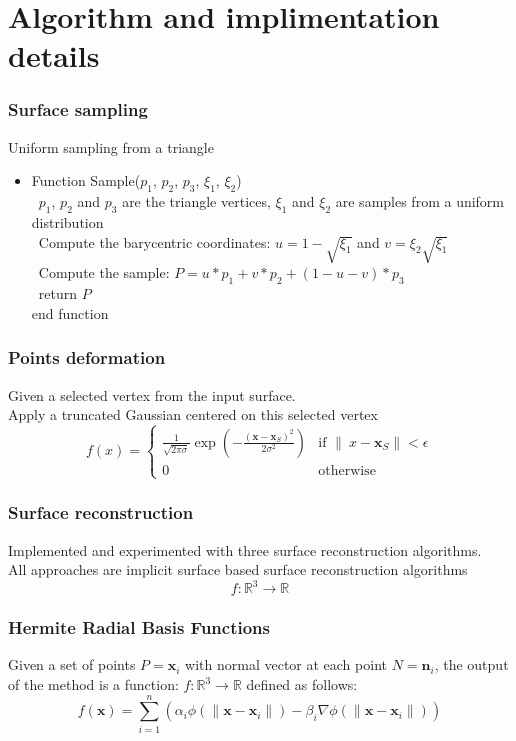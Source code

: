 \documentclass{beamer}
\def\x{\mathbf{x}}
\def\R{\mathbb{R}}
\def\n{\mathbf{n}}
\begin{document}
\section{Algorithm and implimentation details}
\Large

\begin{frame}
\frametitle{Surface sampling}
Uniform sampling from a triangle\\
\begin{itemize}
\item Function Sample($p_1$, $p_2$, $p_3$, $\xi_1$, $\xi_2$)\\

\  $p_1$, $p_2$ and $p_3$ are the triangle vertices, $\xi_1$ and $\xi_2$ are samples from a uniform distribution\\

\  Compute the barycentric coordinates: $u = 1-\sqrt{\xi_1}$ and $v = \xi_2 \sqrt{\xi_1}$\\

\  Compute the sample: $P = u * p_1 + v * p_2 + (1 - u - v) * p_3$\\
\   return $P$\\
end function
\end{itemize}
\end{frame}


\begin{frame}
	\frametitle{Points deformation}

		Given a selected vertex from the input surface. \\
		Apply a truncated Gaussian centered on this selected vertex \\
\[f(x)=
\begin{cases}

 \frac{1}{\sqrt{2\pi \sigma}} \exp \left(- \frac{(\x- \x_S)^{2}}{2 \sigma^{2}}\right) & \text{if } \|\ x-\x_S\| < \epsilon \\
0 & \text{otherwise}
\end{cases}
\]
\end{frame}

\begin{frame}
	\frametitle{Surface reconstruction}
	\Large
	Implemented and experimented with three surface reconstruction algorithms.\\
	All approaches are implicit surface based surface reconstruction algorithms\\
\[f: \R^3 \rightarrow \R\]
\end{frame}


\begin{frame}
	\frametitle{Hermite Radial Basis Functions}
	\Large
Given a set of points $P = {\x_i}$ with normal vector at each point $N = {\n_i}$, 
the output of the method is a function: $f : \R^3 \to \R$ defined as follows:
\[
f(\x)=\sum_{i=1}^n(\alpha_i\phi(\|\x-\x_i\|)-\beta_i\nabla\phi(\|\x-\x_i\|))
\]

\end{frame}
\end{document}
